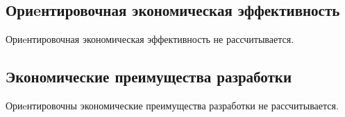 \subsection{Ориeнтировочная экономическая эффективность}
Ориeнтировочная экономическая эффективность не рассчитывается.

\subsection{Экономические преимущества разработки}
Ориeнтировочны экономические преимущества разработки не рассчитывается.